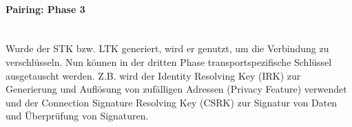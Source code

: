 \paragraph{Pairing: Phase 3} \mbox{} \vspace{0.2cm} \\
\label{sec: le sm phase 3}
Wurde der STK bzw. LTK generiert, wird er genutzt, um die Verbindung zu verschlüsseln. Nun können in der dritten Phase transportspezifische Schlüssel ausgetauscht werden. Z.B. wird der Identity Resolving Key (IRK) zur Generierung und Auflösung von zufälligen Adressen (Privacy Feature) verwendet und der Connection Signature Resolving Key (CSRK) zur Signatur von Daten und Überprüfung von Signaturen.




